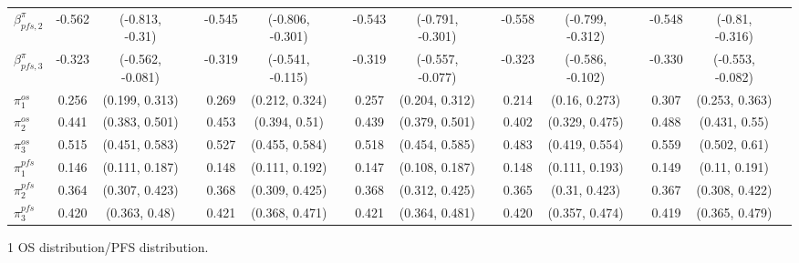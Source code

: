 \documentclass[AMA,STIX1COL]{WileyNJD-v2}
\begin{document}
\begin{landscape}
\begin{center}
\begin{table}[t]
\begin{tabular}{l c c c c c c c c c c c c c c c}
$\beta^{\pi}_{pfs, 2}$ & -0.562 & (-0.813, -0.31) &  & -0.545 & (-0.806, -0.301) &  & -0.543 & (-0.791, -0.301) &  & -0.558 & (-0.799, -0.312) &  & -0.548 & (-0.81, -0.316) & \\
$\beta^{\pi}_{pfs, 3}$ & -0.323 & (-0.562, -0.081) &  & -0.319 & (-0.541, -0.115) &  & -0.319 & (-0.557, -0.077) &  & -0.323 & (-0.586, -0.102) &  & -0.330 & (-0.553, -0.082) & \\
$\pi^{os}_1$ & 0.256 & (0.199, 0.313) &  & 0.269 & (0.212, 0.324) &  & 0.257 & (0.204, 0.312) &  & 0.214 & (0.16, 0.273) &  & 0.307 & (0.253, 0.363) & \\
$\pi^{os}_2$ & 0.441 & (0.383, 0.501) &  & 0.453 & (0.394, 0.51) &  & 0.439 & (0.379, 0.501) &  & 0.402 & (0.329, 0.475) &  & 0.488 & (0.431, 0.55) & \\
$\pi^{os}_3$ & 0.515 & (0.451, 0.583) &  & 0.527 & (0.455, 0.584) &  & 0.518 & (0.454, 0.585) &  & 0.483 & (0.419, 0.554) &  & 0.559 & (0.502, 0.61) & \\
$\pi^{pfs}_1$ & 0.146 & (0.111, 0.187) &  & 0.148 & (0.111, 0.192) &  & 0.147 & (0.108, 0.187) &  & 0.148 & (0.111, 0.193) &  & 0.149 & (0.11, 0.191) & \\
$\pi^{pfs}_2$ & 0.364 & (0.307, 0.423) &  & 0.368 & (0.309, 0.425) &  & 0.368 & (0.312, 0.425) &  & 0.365 & (0.31, 0.423) &  & 0.367 & (0.308, 0.422) & \\
$\pi^{pfs}_3$ & 0.420 & (0.363, 0.48) &  & 0.421 & (0.368, 0.471) &  & 0.421 & (0.364, 0.481) &  & 0.420 & (0.357, 0.474) &  & 0.419 & (0.365, 0.479) & \\
\bottomrule
\end{tabular}
\begin{tablenotes}%
\item[1] OS distribution/PFS distribution.
\end{tablenotes}
\end{table}
\end{center}
\end{landscape}
\end{document}

